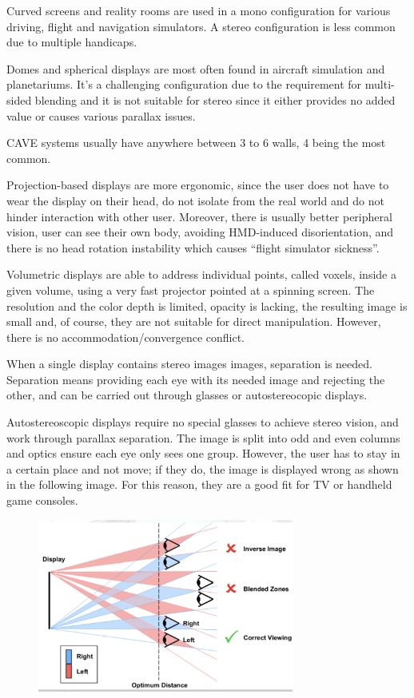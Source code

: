 \documentclass[a4paper]{article}
\begin{document}
Curved screens and reality rooms are used in a mono configuration for
various driving, flight and navigation simulators. A stereo
configuration is less common due to multiple handicaps.

Domes and spherical displays are most often found in aircraft simulation
and planetariums. It's a challenging configuration due to the
requirement for multi-sided blending and it is not suitable for stereo
since it either provides no added value or causes various parallax
issues.

CAVE systems usually have anywhere between 3 to 6 walls, 4 being the
most common.

Projection-based displays are more ergonomic, since the user does not
have to wear the display on their head, do not isolate from the real
world and do not hinder interaction with other user. Moreover, there is
usually better peripheral vision, user can see their own body, avoiding
HMD-induced disorientation, and there is no head rotation instability
which causes ``flight simulator sickness''.

Volumetric displays are able to address individual points, called
voxels, inside a given volume, using a very fast projector pointed at a
spinning screen. The resolution and the color depth is limited, opacity
is lacking, the resulting image is small and, of course, they are not
suitable for direct manipulation. However, there is no
accommodation/convergence conflict.

When a single display contains stereo images images, separation is
needed. Separation means providing each eye with its needed image and
rejecting the other, and can be carried out through glasses or
autostereocopic displays.

Autostereoscopic displays require no special glasses to achieve stereo
vision, and work through parallax separation. The image is split into
odd and even columns and optics ensure each eye only sees one group.
However, the user has to stay in a certain place and not move; if they
do, the image is displayed wrong as shown in the following image. For
this reason, they are a good fit for TV or handheld game consoles.

\begin{figure}
\centering
\includegraphics[width=0.75\textwidth]{autostereoscopic-issues}
\end{figure}
\end{document}
